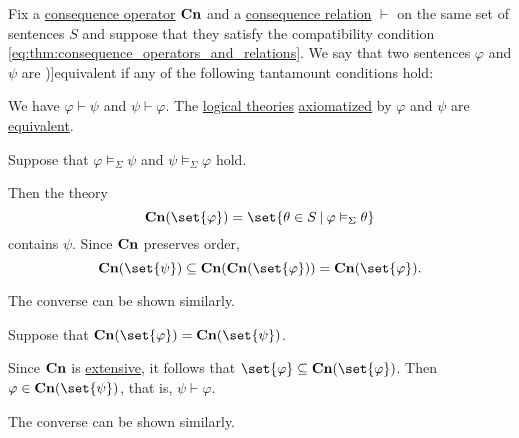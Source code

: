 \begin{definition}\label{def:consequence_formula_equivalence}\mimprovised
  Fix a \hyperref[def:consequence_operator]{consequence operator} \( \op*{Cn} \) and a \hyperref[def:consequence_relation]{consequence relation} \( {\vdash} \) on the same set of sentences \( S \) and suppose that they satisfy the compatibility condition \eqref{eq:thm:consequence_operators_and_relations}. We say that two sentences \( \varphi \) and \( \psi \) are \term[ru=равносильные / эквивалентные (формулы) (\cite[44]{КолмогоровДрагалин2006})]{equivalent} if any of the following tantamount conditions hold:
  \begin{thmenum}
     We have \( \varphi \vdash \psi \) and \( \psi \vdash \varphi \).
     The \hyperref[def:logical_theory]{logical theories} \hyperref[def:logical_theory/axiomatization]{axiomatized} by \( \varphi \) and \( \psi \) are \hyperref[def:logical_theory]{equivalent}.
  \end{thmenum}
\end{definition}
\begin{defproof}
   Suppose that \( \varphi \vDash_\Sigma \psi \) and \( \psi \vDash_\Sigma \varphi \) hold.

  Then the theory
  \begin{equation*}
    \op*{Cn}(\set{ \varphi }) = \set{ \theta \in S \given \varphi \vDash_\Sigma \theta }
  \end{equation*}
  contains \( \psi \). Since \( \op*{Cn} \) preserves order,
  \begin{equation*}
    \op*{Cn}(\set{ \psi }) \subseteq \op*{Cn}(\op*{Cn}(\set{ \varphi })) = \op*{Cn}(\set{ \varphi }).
  \end{equation*}

  The converse can be shown similarly.

   Suppose that \( \op*{Cn}(\set{ \varphi }) = \op*{Cn}(\set{ \psi }) \).

  Since \( \op*{Cn} \) is \hyperref[def:extensive_function]{extensive}, it follows that \( \set{ \varphi } \subseteq \op*{Cn}(\set{ \varphi }) \). Then \( \varphi \in \op*{Cn}(\set{ \psi }) \), that is, \( \psi \vdash \varphi \).

  The converse can be shown similarly.
\end{defproof}

